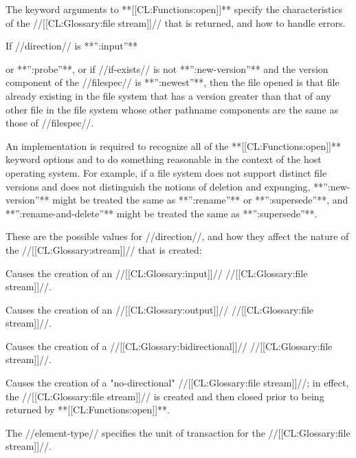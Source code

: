 The keyword arguments to **[[CL:Functions:open]]** specify the characteristics of the //[[CL:Glossary:file stream]]// that is returned, and how to handle errors.

If //direction// is **'':input''**

or **'':probe''**, or if //if-exists// is not **'':new-version''** and the version component of the //filespec// is **'':newest''**, then the file opened is that file already existing in the file system that has a version greater than that of any other file in the file system whose other pathname components are the same as those of //filespec//.

An implementation is required to recognize all of the **[[CL:Functions:open]]** keyword options and to do something reasonable in the context of the host operating system. For example, if a file system does not support distinct file versions and does not distinguish the notions of deletion and expunging, **'':new-version''** might be treated the same as **'':rename''** or **'':supersede''**, and **'':rename-and-delete''** might be treated the same as **'':supersede''**.

\beginlist


These are the possible values for //direction//, and how they affect the nature of the //[[CL:Glossary:stream]]// that is created:

\beginlist


Causes the creation of an //[[CL:Glossary:input]]// //[[CL:Glossary:file stream]]//.


Causes the creation of an //[[CL:Glossary:output]]// //[[CL:Glossary:file stream]]//.


Causes the creation of a //[[CL:Glossary:bidirectional]]// //[[CL:Glossary:file stream]]//.


Causes the creation of a "no-directional" //[[CL:Glossary:file stream]]//; in effect, the //[[CL:Glossary:file stream]]// is created and then closed prior to being returned by **[[CL:Functions:open]]**.

\endlist


The //element-type// specifies the unit of transaction for the //[[CL:Glossary:file stream]]//.

